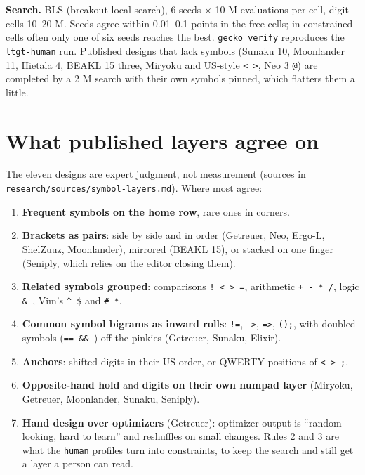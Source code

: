 \documentclass{gecko-paper}
\begin{document}
{\textbf{Search.} BLS (breakout local search), 6 seeds $\times$ 10 M evaluations per cell, digit cells 10–20 M. Seeds agree within 0.01–0.1 points in the free cells; in constrained cells often only one of six seeds reaches the best. \texttt{gecko\ verify} reproduces the \texttt{ltgt-human} run. Published designs that lack symbols (Sunaku 10, Moonlander 11, Hietala 4, BEAKL 15 three, Miryoku and US-style
\texttt{\textless{}\ \textgreater{}}, Neo 3 \texttt{@}) are completed by a 2 M search with their own symbols pinned, which flatters them a little.

\section{What published layers agree on}

The eleven designs are expert judgment, not measurement (sources in \texttt{research/sources/symbol-layers.md}). Where most agree:

\begin{enumerate}
\def\labelenumi{\arabic{enumi}.}
\setlength{\itemsep}{1pt}\setlength{\parskip}{0pt}
\item
  \textbf{Frequent symbols on the home row}, rare ones in corners.
\item
  \textbf{Brackets as pairs}: side by side and in order (Getreuer, Neo, Ergo-L, ShelZuuz, Moonlander), mirrored (BEAKL 15), or stacked on one finger (Seniply, which relies on the editor closing them).
\item
  \textbf{Related symbols grouped}: comparisons \texttt{!\ \textless{}\ \textgreater{}\ =}, arithmetic \texttt{+\ -\ *\ /}, logic \texttt{\&\ \textbar{}}, Vim's \texttt{\^{}\ \$} and \texttt{\#\ *}.
\item
  \textbf{Common symbol bigrams as inward rolls}: \texttt{!=}, \texttt{-\textgreater{}}, \texttt{=\textgreater{}}, \texttt{();}, with doubled symbols (\texttt{==\ \&\&\ \textbar{}\textbar{}}) off the pinkies (Getreuer, Sunaku, Elixir).
\item
  \textbf{Anchors}: shifted digits in their US order, or QWERTY positions of \texttt{\textless{}\ \textgreater{}\ ;}.
\item
  \textbf{Opposite-hand hold} and \textbf{digits on their own numpad layer} (Miryoku, Getreuer, Moonlander, Sunaku, Seniply).
\item
  \textbf{Hand design over optimizers} (Getreuer): optimizer output is “random-looking, hard to learn” and reshuffles on small changes. Rules 2 and 3 are what the \texttt{human} profiles turn into constraints, to keep the search and still get a layer a person can read.
\end{enumerate}

}
\end{document}
